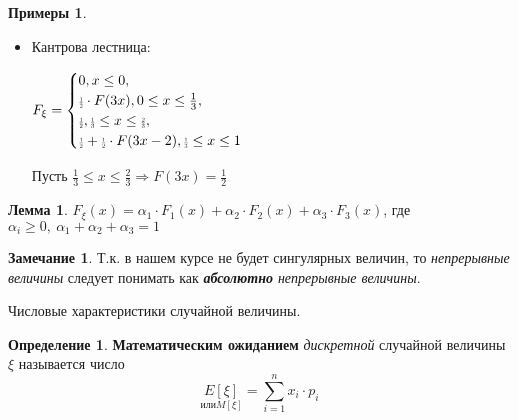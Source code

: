 \documentclass[a4paper, 12pt]{article}
\theoremstyle{definition}
\newtheorem{Definition}{Определение}
\newtheorem{Lemma}{Лемма}
\newtheorem{Examples}{Примеры}
\newtheorem{Note}{Замечание}
\begin{document}
    \begin{Examples}
    \leavevmode
        \begin{itemize}
            \item
                Кантрова лестница:

                \(F_{\xi} = \begin{cases}
                    0, x \le 0, \\
                    \scalebox{0.6}{$\frac{1}{2}$} \cdot F(3x), 0 \le x \le \frac{1}{3}, \\
                    \scalebox{0.6}{$\frac{1}{2}$}, \scalebox{0.6}{$\frac{1}{3}$} \le x \le \scalebox{0.6}{$\frac{2}{3}$}, \\
                    \scalebox{0.6}{$\frac{1}{2}$} + \scalebox{0.6}{$\frac{1}{2}$} \cdot F(3x - 2),
                    \scalebox{0.6}{$\frac{1}{3}$} \le x \le 1
                \end{cases}\)

                \newpage

                Пусть \(\frac{1}{3} \le x \le \frac{2}{3} \Rightarrow F(3x) = \frac{1}{2}\)
        \end{itemize}
    \end{Examples}

    \begin{Lemma}
        \(F_{\xi}(x) = \alpha_1 \cdot F_1(x) + \alpha_2 \cdot F_2(x) + \alpha_3 \cdot F_3(x)\),
        где \(\alpha_i \ge 0, \ \alpha_1 + \alpha_2 + \alpha_3 = 1\)
    \end{Lemma}

    \begin{Note}
        Т.к. в нашем курсе не будет сингулярных величин, то \textit{непрерывные величины} следует понимать как
        \textit{\textbf{абсолютно} непрерывные величины}.
    \end{Note}

    \begin{center}
        Числовые характеристики случайной величины.
    \end{center}

        

    \begin{Definition}
        \textbf{Математическим ожиданием} \textit{дискретной} случайной величины \(\xi\) называется число 
        \[\underset{\text{или} M[\xi]}{E[\xi]} = \sum^{n}_{i = 1} x_i \cdot p_i\]
    \end{Definition}
\end{document}
